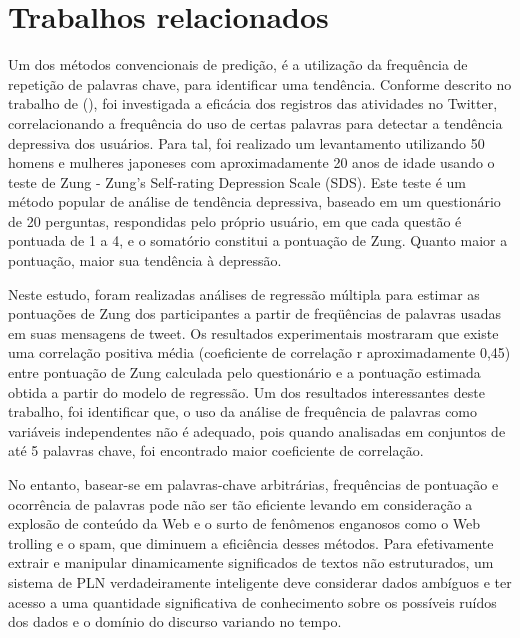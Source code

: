 \documentclass[
	12pt,				%
	openright,			%
	oneside,			%
	a4paper,			%
	english,			%
	spanish,			%
	brazil				%
	]{abntex2}
\begin{document}
\section{Trabalhos relacionados}

	Um dos métodos convencionais de predição, é a utilização da frequência de repetição de palavras chave, para identificar uma tendência. Conforme descrito no trabalho de  (\citeyear{article_Tsugawa2013}), foi investigada a eficácia dos registros das atividades no Twitter, correlacionando a frequência do uso de certas palavras para detectar a tendência depressiva dos usuários. Para tal, foi realizado um levantamento utilizando 50 homens e mulheres japoneses com aproximadamente 20 anos de idade usando o teste de Zung - Zung’s Self-rating Depression Scale (SDS). Este teste é um método popular de análise de tendência depressiva, baseado em um questionário de 20 perguntas, respondidas pelo próprio usuário, em que cada questão é pontuada de 1 a 4, e o somatório constitui a pontuação de Zung. Quanto maior a pontuação, maior sua tendência à depressão. 
	
	Neste estudo, foram realizadas análises de regressão múltipla para estimar as pontuações de Zung dos participantes a partir de freqüências de palavras usadas em suas mensagens de tweet. Os resultados experimentais mostraram que existe uma correlação positiva média (coeficiente de correlação r aproximadamente 0,45) entre pontuação de Zung calculada pelo questionário e a pontuação estimada obtida a partir do modelo de regressão. Um dos resultados interessantes deste trabalho, foi identificar que, o uso da análise de frequência de palavras como variáveis independentes não é adequado, pois quando analisadas em conjuntos de até 5 palavras chave, foi encontrado maior coeficiente de correlação.

	No entanto, basear-se em palavras-chave arbitrárias, frequências de pontuação e ocorrência de palavras pode não ser tão eficiente levando em consideração a explosão de conteúdo da Web e o surto de fenômenos enganosos como o Web trolling e o spam, que diminuem a eficiência desses métodos. Para efetivamente extrair e manipular dinamicamente significados de textos não estruturados, um sistema de PLN verdadeiramente inteligente deve considerar dados ambíguos e ter acesso a uma quantidade significativa de conhecimento sobre os possíveis ruídos dos dados e o domínio do discurso variando no tempo.
\end{document}

